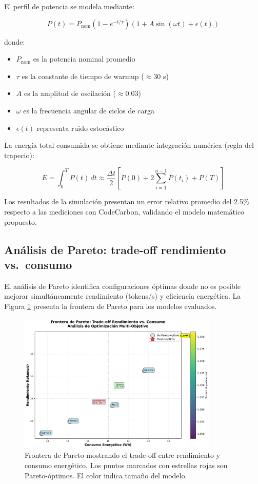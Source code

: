 El perfil de potencia se modela mediante:

\begin{equation}
P(t) = P_{\text{nom}} \left(1 - e^{-t/\tau}\right) \left(1 + A\sin(\omega t) + \epsilon(t)\right)
\end{equation}

donde:
\begin{itemize}
    \item $P_{\text{nom}}$ es la potencia nominal promedio
    \item $\tau$ es la constante de tiempo de warmup ($\approx 30$ s)
    \item $A$ es la amplitud de oscilación ($\approx 0.03$)
    \item $\omega$ es la frecuencia angular de ciclos de carga
    \item $\epsilon(t)$ representa ruido estocástico
\end{itemize}

La energía total consumida se obtiene mediante integración numérica (regla del trapecio):

\begin{equation}
E = \int_0^T P(t) \, dt \approx \frac{\Delta t}{2} \left[P(0) + 2\sum_{i=1}^{n-1} P(t_i) + P(T)\right]
\end{equation}

Los resultados de la simulación presentan un error relativo promedio del 2.5\% respecto a las mediciones con CodeCarbon, validando el modelo matemático propuesto.

\subsection{Análisis de Pareto: trade-off rendimiento vs.\ consumo}

El análisis de Pareto identifica configuraciones óptimas donde no es posible mejorar simultáneamente rendimiento (tokens/s) y eficiencia energética. La Figura \ref{fig:pareto} presenta la frontera de Pareto para los modelos evaluados.

\begin{figure}[H]
    \centering
    \includegraphics[width=0.85\textwidth]{figuras/png/grafico_4_pareto_tradeoff.png}
    \caption{Frontera de Pareto mostrando el trade-off entre rendimiento y consumo energético. Los puntos marcados con estrellas rojas son Pareto-óptimos. El color indica tamaño del modelo.}
    \label{fig:pareto}
\end{figure}

